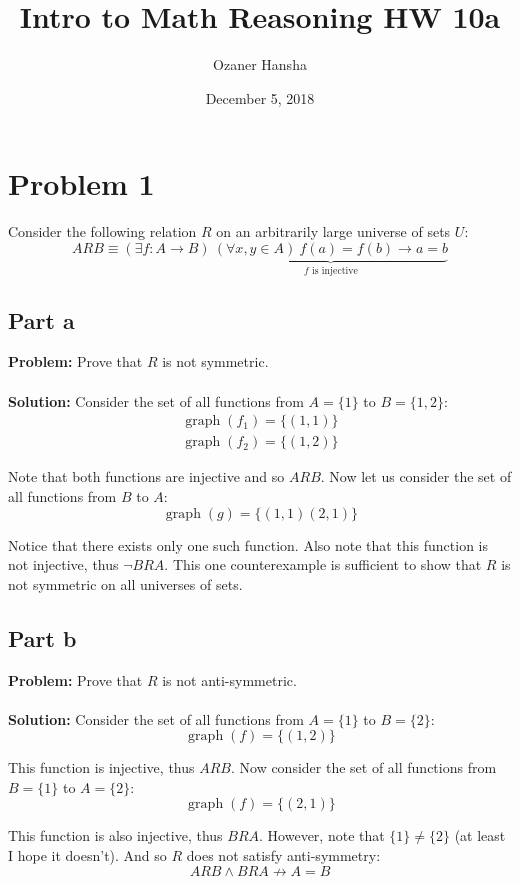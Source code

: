 \documentclass{article}
\begin{document}
\title{Intro to Math Reasoning HW 10a}
\author{Ozaner Hansha}
\date{December 5, 2018}
\maketitle

\section*{Problem 1}
Consider the following relation $R$ on an arbitrarily large universe of sets $U$:
$$ARB\equiv(\exists f:A\to B)\ \underbrace{(\forall x,y\in A)\  f(a)=f(b)\rightarrow a=b}_{f \text{ is injective}}$$
\subsection*{Part a}
\textbf{Problem:} Prove that $R$ is not symmetric.
\\\\
\textbf{Solution:} Consider the set of all functions from $A=\{1\}$ to $B=\{1,2\}$:
\begin{align*}
  \operatorname{graph}(f_1)=\{(1,1)\}\\
  \operatorname{graph}(f_2)=\{(1,2)\}
\end{align*}

Note that both functions are injective and so $ARB$. Now let us consider the set of all functions from $B$ to $A$:
$$\operatorname{graph}(g)=\{(1,1)(2,1)\}$$

Notice that there exists only one such function. Also note that this function is not injective, thus $\neg BRA$. This one counterexample is sufficient to show that $R$ is not symmetric on all universes of sets.

\subsection*{Part b}
\textbf{Problem:} Prove that $R$ is not anti-symmetric.
\\\\
\textbf{Solution:} Consider the set of all functions from $A=\{1\}$ to $B=\{2\}$:
$$\operatorname{graph}(f)=\{(1,2)\}$$

This function is injective, thus $ARB$. Now consider the set of all functions from $B=\{1\}$ to $A=\{2\}$:
$$\operatorname{graph}(f)=\{(2,1)\}$$

This function is also injective, thus $BRA$. However, note that $\{1\}\not=\{2\}$ (at least I hope it doesn't). And so $R$ does not satisfy anti-symmetry:
$$ARB \wedge BRA \not\rightarrow A=B$$
\end{document}
